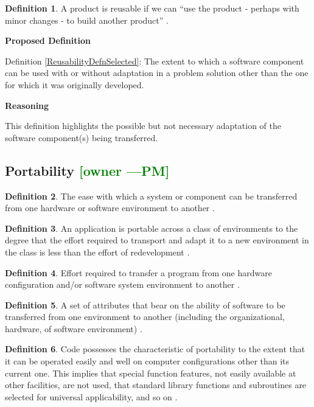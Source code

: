 \documentclass[letterpaper,cleveref]{lipics-v2019}
\newcommand{\authornote}[3]{\textcolor{#1}{[#3 ---#2]}}
\newcommand{\authornote}[3]{}
\newcommand{\pmi}[1]{\authornote{green}{PM}{#1}} %
\theoremstyle{definition}
\newtheorem{defn}{Definition}
\begin{document}
\begin{defn}
  A product is reusable if we can ``use the product - perhaps with minor changes
  - to build another product'' \citep{ghezzi1991fundamentals}.
\end{defn}

\noindent \textbf{Proposed Definition}

Definition \ref{ReusabilityDefnSelected}: The extent to which a software
component can be used with or without adaptation in a problem solution other
than the one for which it was originally developed.

\noindent \textbf{Reasoning}

This definition highlights the possible but not necessary adaptation of the
software component(s) being transferred.

\subsection{{Portability} \pmi{owner}}

\begin{defn}
  The ease with which a system or component can be transferred from one hardware
  or software environment to another \citep{IEEEStdGlossarySET1990}.
\end{defn}

\begin{defn}
  An application is portable across a class of environments to the degree that
  the effort required to transport and adapt it to a new environment in the
  class is less than the effort of redevelopment \citep{mooney1990strategies}.
\end{defn}

\begin{defn} \label{PortabilityDefnSelected} Effort required to transfer a program from one hardware configuration and/or software system environment to another \citep{McCallEtAl1977}.
\end{defn}

\begin{defn}
  A set of attributes that bear on the ability of software to be transferred
  from one environment to another (including the organizational, hardware, of
  software environment) \citep{pfleeger2006software}.
\end{defn}

\begin{defn}
  Code possesses the characteristic of portability to the extent that it can be
  operated easily and well on computer configurations other than its current
  one. This implies that special function features, not easily available at
  other facilities, are not used, that standard library functions and
  subroutines are selected for universal applicability, and so on
  \citep{boehm2007software}.
\end{defn}
\end{document}
